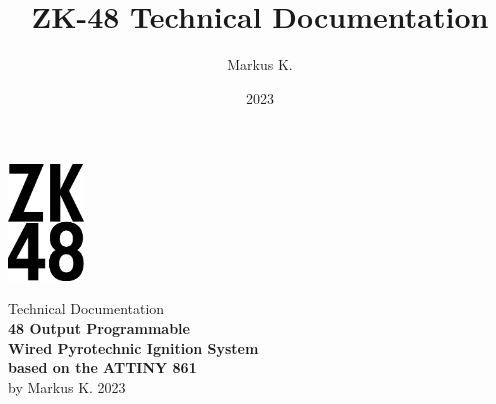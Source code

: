 

\title{ZK-48 Technical Documentation}
\author{Markus K.}
\date{2023}

%



\begin{titlepage}
\begin{center}
\vspace*{1cm}
\includegraphics[width=2cm]{./Figures/zk_48_logo.png}
\vspace*{1cm}

\Huge {Technical Documentation\\} 
\vspace*{1cm}
\Huge{\textbf{48 Output Programmable\\ Wired Pyrotechnic Ignition System\\ based on the ATTINY 861\\}}
\vspace*{0.5cm} 
\Large{by Markus K.}
\vspace*{0.5cm}
\Large{2023}

\end{center}
\end{titlepage}

\pagebreak 

\tableofcontents

\pagebreak



















